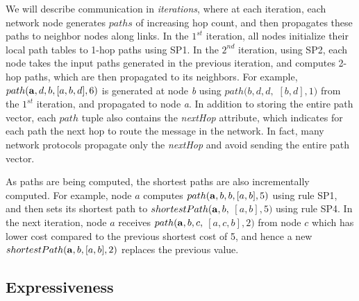 We will describe communication in {\em iterations}, where at each
iteration, each network node generates $paths$ of increasing hop count, and then
propagates these paths to neighbor nodes along links. In the $1^{st}$
iteration, all nodes initialize their local path tables to 1-hop
paths using SP1. In the $2^{nd}$ iteration, using SP2, each node takes the input
paths generated in the previous iteration, and computes 2-hop paths,
which are then propagated to its neighbors. For example, $path({\bf
  a},d,b,[a,b,d],6)$ is generated at node {\em b} using
$path(b,d,d,$ $[b,d],1)$ from the $1^{st}$ iteration, and propagated to node
{\em a}. In addition to storing the entire path vector, each $path$
tuple also contains the {\em nextHop} attribute, which indicates for each path the next hop to
route the message in the network. In fact, many network protocols
propagate only the {\em nextHop} and avoid sending the entire path vector.

As paths are being computed, the shortest paths are also
incrementally computed. For example, node $a$ computes $path({\bf
  a},b,b,[a,b],5)$ using rule SP1, and then sets its shortest path to
$shortestPath({\bf a},b,$ $[a,b],5)$ using rule SP4. In the next iteration, node $a$
receives $path({\bf a},b,c,$ $[a,c,b],2)$ from node $c$ which has lower cost
compared to the previous shortest cost of 5, and hence a new $shortestPath({\bf a},b,[a,b],2)$ replaces the previous value.








\subsection{Expressiveness}
\label{subsec:shortestPath}

